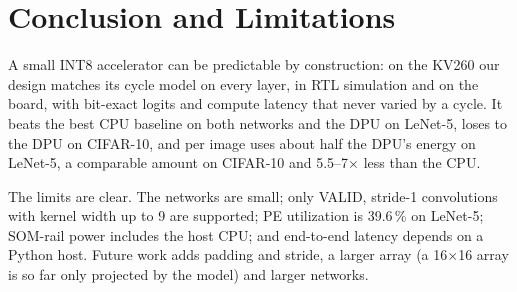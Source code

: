 \section{Conclusion and Limitations}\label{sec:conclusion}
A small INT8 accelerator can be predictable by construction: on the KV260
our design matches its cycle model on every layer, in RTL simulation and on
the board, with bit-exact logits and compute latency that never varied by a
cycle. It beats the best CPU baseline on both networks and the DPU on
LeNet-5, loses to the DPU on CIFAR-10, and per image uses about half the
DPU's energy on LeNet-5, a comparable amount on CIFAR-10 and 5.5--7$\times$
less than the CPU.

The limits are clear. The networks are small; only VALID, stride-1
convolutions with kernel width up to 9 are supported; PE utilization is
39.6\,\% on LeNet-5; SOM-rail power includes the host CPU; and end-to-end
latency depends on a Python host. Future work adds padding and stride, a
larger array (a 16$\times$16 array is so far only projected by the model)
and larger networks.
